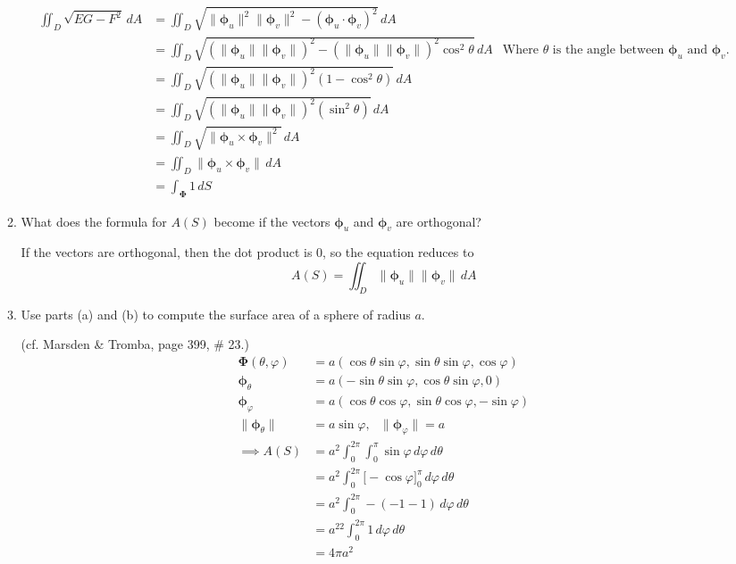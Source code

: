 \documentclass{article}
\newcommand{\norm}[1]{\| #1 \|}
\begin{document}
\begin{enumerate}
\begin{enumerate}
        \begin{align*}
            \iint_D \sqrt{EG - F^2}\,dA &= \iint_D \sqrt{\norm{\boldsymbol \phi_u}^2 \norm{\boldsymbol \phi_v}^2 - (\boldsymbol \phi_u \cdot \boldsymbol \phi_v)^2} \, dA \\
            &= \iint_D \sqrt{(\norm{\boldsymbol \phi_u}\norm{\boldsymbol \phi_v})^2 - (\norm{ \boldsymbol \phi_u} \norm{\boldsymbol \phi_v})^2 \cos^2\theta }\, dA & \text{Where $\theta$ is the angle between $\boldsymbol \phi_u$ and $\boldsymbol \phi_v$.}\\
            &= \iint_D \sqrt{(\norm{\boldsymbol \phi_u}\norm{\boldsymbol \phi_v})^2 (1 - \cos^2\theta) } \, dA \\
            &= \iint_D \sqrt{(\norm{\boldsymbol \phi_u}\norm{\boldsymbol \phi_v})^2 (\sin^2\theta) } \, dA \\
            &= \iint_D \sqrt{\norm{\boldsymbol \phi_u \times \boldsymbol \phi_v} ^2} \, dA \\
            &= \iint_D \norm{\boldsymbol \phi_u \times \boldsymbol \phi_v} \, dA \\
            &= \int_{\boldsymbol \Phi} 1\, dS
        \end{align*} 
        \item What does the formula for $A(S)$ become if the vectors $\boldsymbol \phi_u$ and $\boldsymbol \phi_v$ are orthogonal?


        If the vectors are orthogonal, then the dot product is 0, so the equation reduces to 
        \[ A(S) = \iint_D \norm{\boldsymbol \phi_u} \norm{\boldsymbol \phi_v}\, dA \]
        \item Use parts (a) and (b) to compute the surface area of a sphere of radius $a$.

        (cf. Marsden \& Tromba, page 399, \# 23.)
        \begin{align*}
            \boldsymbol \Phi (\theta, \varphi) &= a(\cos \theta \sin \varphi, \sin \theta \sin \varphi, \cos \varphi) \\
            \boldsymbol \phi_\theta &= a(- \sin \theta \sin \varphi, \cos \theta \sin \varphi, 0) \\
            \boldsymbol \phi_\varphi &= a( \cos \theta \cos \varphi, \sin \theta \cos \varphi, -\sin \varphi) \\
            \norm{\boldsymbol \phi_\theta} &= a\sin \varphi, \: \: \: \norm{\boldsymbol \phi_\varphi} = a \\
            \implies A(S) &= a^2\int_0^{2\pi}\int_0^\pi \sin \varphi \, d\varphi \, d\theta \\
            &= a^2\int_0^{2\pi}\Big[- \cos \varphi \Big]_0^{\pi} \, d\varphi \, d\theta \\
            &= a^2\int_0^{2\pi}- (-1 - 1) \, d\varphi \, d\theta \\
            &= a^22\int_0^{2\pi}1 \, d\varphi \, d\theta \\
            &= 4\pi a^2\\
        \end{align*} 




\end{enumerate}
\end{enumerate}
\end{document}

